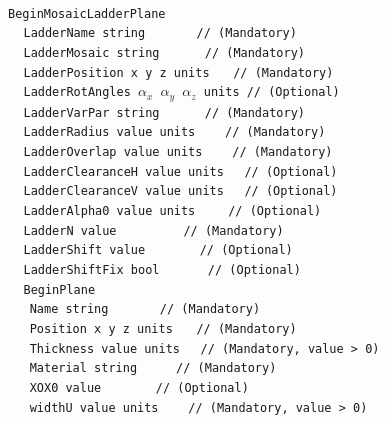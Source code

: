 ~\\
\noindent
{\tt BeginMosaicLadderPlane} \\
$~~~~~${\tt LadderName        string                   $~~~~~~~~~~~~$   // (Mandatory)} \\
$~~~~~${\tt LadderMosaic      string                     $~~~~~~~~~~$   // (Mandatory)} \\
$~~~~~${\tt LadderPosition    x  y  z units                     $~~~$   // (Mandatory)} \\
$~~~~~${\tt LadderRotAngles   $\alpha_x$  $\alpha_y$  $\alpha_z$ units  // (Optional)}  \\
$~~~~~${\tt LadderVarPar      string                     $~~~~~~~~~~$   // (Mandatory)} \\
$~~~~~${\tt LadderRadius      value units                    $~~~~~$    // (Mandatory)} \\
$~~~~~${\tt LadderOverlap     value units                    $~~~~~$    // (Mandatory)} \\
$~~~~~${\tt LadderClearanceH  value units                       $~~$    // (Optional)} \\
$~~~~~${\tt LadderClearanceV  value units                       $~~$    // (Optional)} \\
$~~~~~${\tt LadderAlpha0      value units                   $~~~~~~$    // (Optional)} \\
$~~~~~${\tt LadderN           value              $~~~~~~~~~~~~~~~~~$    // (Mandatory)} \\
$~~~~~${\tt LadderShift       value                  $~~~~~~~~~~~~~$    // (Optional)} \\
$~~~~~${\tt LadderShiftFix    bool                      $~~~~~~~~~~~$    // (Optional)} \\
$~~~~~${\tt BeginPlane} \\
$~~~~~~~${\tt Name             string                   $~~~~~~~~~~~~$   // (Mandatory)} \\
$~~~~~~~${\tt Position         x  y  z units                     $~~~$   // (Mandatory)} \\
$~~~~~~~${\tt Thickness        value  units                       $~~$   // (Mandatory, value > 0)} \\
$~~~~~~~${\tt Material         string                       $~~~~~~~~$   // (Mandatory)} \\
$~~~~~~~${\tt XOX0             value                   $~~~~~~~~~~~~~$   // (Optional)}  \\
$~~~~~~~${\tt widthU           value units                     $~~~~~$   // (Mandatory, value > 0)} \\
